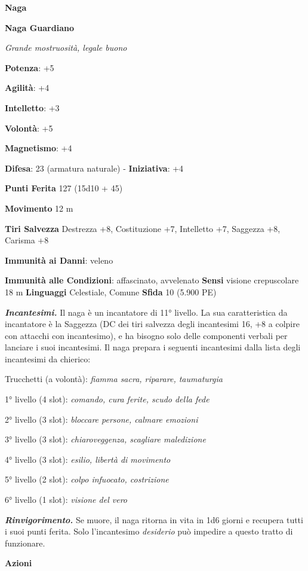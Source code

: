 \begin{multicols}{2}
\textbf{Naga}

\textbf{Naga Guardiano}

\emph{Grande mostruosità, legale buono}

\textbf{Potenza}: +5

\textbf{Agilità}: +4

\textbf{Intelletto}: +3

\textbf{Volontà}: +5

\textbf{Magnetismo}: +4

\textbf{Difesa}: 23 (armatura naturale) - \textbf{Iniziativa}: +4

\textbf{Punti Ferita} 127 (15d10 + 45)

\textbf{Movimento} 12 m

\textbf{Tiri Salvezza} Destrezza +8, Costituzione +7, Intelletto +7,
Saggezza +8, Carisma +8

\textbf{Immunità ai Danni}: veleno

\textbf{Immunità alle Condizioni}: affascinato, avvelenato \textbf{Sensi}
visione crepuscolare 18 m \textbf{Linguaggi} Celestiale,
Comune \textbf{Sfida} 10 (5.900 PE)\smallskip

\emph{\textbf{Incantesimi.}} Il naga è un incantatore di 11° livello. La
sua caratteristica da incantatore è la Saggezza (DC dei tiri salvezza
degli incantesimi 16, +8 a colpire con attacchi con incantesimo), e ha
bisogno solo delle componenti verbali per lanciare i suoi incantesimi.
Il naga prepara i seguenti incantesimi dalla lista degli incantesimi da
chierico:

Trucchetti (a volontà): \emph{fiamma sacra, riparare, taumaturgia}

1° livello (4 slot): \emph{comando, cura ferite, scudo della fede}

2° livello (3 slot): \emph{bloccare persone, calmare emozioni}

3° livello (3 slot): \emph{chiaroveggenza, scagliare maledizione}

4° livello (3 slot): \emph{esilio, libertà di movimento}

5° livello (2 slot): \emph{colpo infuocato, costrizione}

6° livello (1 slot): \emph{visione del vero}

\emph{\textbf{Rinvigorimento.}} Se muore, il naga ritorna in vita in 1d6
giorni e recupera tutti i suoi punti ferita. Solo l'incantesimo
\emph{desiderio} può impedire a questo tratto di funzionare.

\smallskip\textbf{Azioni}


\end{multicols}
